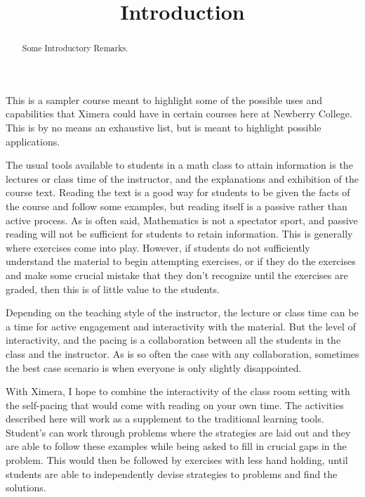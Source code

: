 \documentclass{ximera}
\title{Introduction}
\begin{document}
      
\begin{abstract}
      
Some Introductory Remarks.      
\end{abstract}
      
\maketitle
      
      
This is a sampler course meant to highlight some of the possible uses and capabilities that Ximera could have in certain courses here at Newberry College.  This is by no means an exhaustive list, but is meant to highlight possible applications.

The usual tools available to students in a math class to attain information is the lectures or class time of the instructor, and the explanations and exhibition of the course text.  Reading the text is a good way for students to be given the facts of the course and follow some examples, but reading itself is a passive rather than active process.  As is often said, Mathematics is not a spectator sport, and passive reading will not be sufficient for students to retain information.  This is generally where exercises come into play.  However, if students do not sufficiently understand the material to begin attempting exercises, or if they do the exercises and make some crucial mistake that they don't recognize until the exercises are graded, then this is of little value to the students.

Depending on the teaching style of the instructor, the lecture or class time can be a time for active engagement and interactivity with the material.  But the level of interactivity, and the pacing is a collaboration between all the students in the class and the instructor.  As is so often the case with any collaboration, sometimes the best case scenario is when everyone is only slightly disappointed.

With Ximera, I hope to combine the interactivity of the class room setting with the self-pacing that would come with reading on your own time.  The activities described here will work as a supplement to the traditional learning tools.  Student's can work through problems where the strategies are laid out and they are able to follow these examples while being asked to fill in crucial gaps in the problem.  This would then be followed by exercises with less hand holding, until students are able to independently devise strategies to problems and find the solutions.
\end{document}

